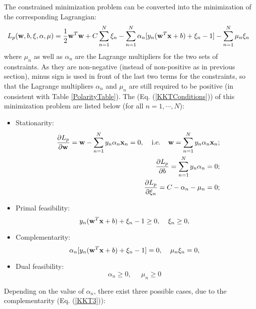 \documentclass{article}
\begin{document}
The constrained minimization problem can be converted into the 
minimization of the corresponding Lagrangian:
\begin{equation}
  L_p({\bf w},b,{\bf\xi},{\bf\alpha},{\bf\mu})
  =\frac{1}{2}{\bf w}^T{\bf w}+C\sum_{n=1}^N\xi_n
  -\sum_{n=1}^N \alpha_n[y_n({\bf w}^T{\bf x}+b)+\xi_n-1]-\sum_{n=1}^N\mu_n\xi_n
  \label{1NormSoftMargin}
\end{equation}
where $\mu_n$ as well as $\alpha_n$ are the Lagrange multipliers for 
the two sets of constraints. As they are non-negative (instead of 
non-positive as in previous section), minus sign is used in front of 
the last two terms for the constraints, so that the Lagrange multipliers 
$\alpha_n$ and $\mu_n$ are still required to be positive (in consistent 
with Table \ref{PolarityTable}). The 
(Eq. (\ref{KKTConditions})) of 
this minimization problem are listed below (for all $n=1,\cdots,N$):
\begin{itemize}
\item Stationarity:
  \begin{eqnarray}
    &&\frac{\partial L_p}{\partial {\bf w}}={\bf w}-\sum_{n=1}^N y_n\alpha_n{\bf x}_n=0,
    \;\;\;\;\mbox{i.e.}\;\;\;\;{\bf w}=\sum_{n=1}^N y_n\alpha_n{\bf x}_n;
    \label{KKT1}\\
    &&\frac{\partial L_p}{\partial b}=\sum_{n=1}^N y_n\alpha_n=0;\\
    &&\frac{\partial L_p}{\partial \xi_n}=C-\alpha_n-\mu_n=0;
  \end{eqnarray}

\item Primal feasibility:
  \begin{equation}
    y_n({\bf w}^T{\bf x}+b)+\xi_n-1\ge 0,\;\;\;\;\xi_n\ge 0,
    \label{KKT2}
  \end{equation}
\item Complementarity:
  \begin{equation}
    \alpha_n[y_n({\bf w}^T{\bf x}+b)+\xi_n-1]=0,\;\;\;\;\mu_n\xi_n=0,
    \label{KKT3}
  \end{equation}
\item Dual feasibility:
  \begin{equation}
    \alpha_n\ge 0,\;\;\;\;\;\mu_n\ge 0
    \label{KKT4}
  \end{equation}
\end{itemize}
Depending on the value of $\alpha_n$, there exist three possible cases, 
due to the complementarity (Eq. (\ref{KKT3})):
\end{document}
